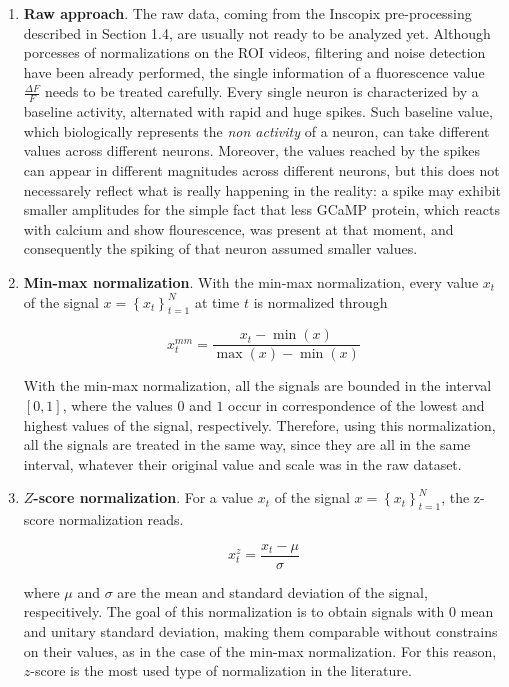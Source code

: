 \documentclass[12pt, a4paper]{report}
\begin{document}
\begin{enumerate}
	
	\item \textbf{Raw approach}. The raw data, coming from the Inscopix pre-processing described in Section 1.4, are usually not ready to be analyzed yet. Although porcesses of normalizations on the ROI videos, filtering and noise detection  have been already performed, the single information of a fluorescence value $\frac{\Delta F}{F}$ needs to be treated carefully. Every single neuron is characterized by a baseline activity, alternated with rapid and huge spikes. Such baseline value, which biologically represents the \textit{non activity} of a neuron, can take different values across different neurons. Moreover, the values reached by the spikes can appear in different magnitudes across different neurons, but this does not necessarely reflect  what is really happening in the reality: a spike may exhibit smaller amplitudes for the simple fact that less GCaMP protein, which reacts with calcium and show flourescence, was present at that moment, and consequently the spiking of that neuron assumed smaller values. 
	
	\item \textbf{Min-max normalization}. With the min-max normalization, every value $x_t$ of the signal $ x = \left\{ x_t\right\}_{t=1}^N$ at time $t$ is normalized through
	
	\begin{equation}
	x_t^{mm} = \frac{x_t -  \min(x)}{\max(x) - \min(x)}
	\end{equation}
	
	With the min-max normalization, all the signals are bounded in the interval $[0,1]$, where the values $0$ and $1$ occur in correspondence of the lowest and  highest values of the signal, respectively. Therefore, using this normalization, all the signals are treated in the same way, since they are all in the same interval, whatever their original value and scale was in the raw dataset.
	
	\item \textbf{$Z$-score normalization}. For a value  $x_t$ of the signal $ x = \left\{ x_t\right\}_{t=1}^N$, the z-score normalization reads. 
	
	\begin{equation}
	x_t^{z} = \frac{x_t -  \mu}{\sigma}
	\end{equation}
	
	where $\mu$ and $\sigma$ are the mean and standard deviation of the signal, respecitively. The goal of this normalization is to obtain signals with $0$  mean and unitary standard deviation, making them comparable without constrains on their values, as in the case of the min-max normalization. For this reason, $z$-score is the most used type of normalization in the literature.
	
	
\end{enumerate}
\end{document}
